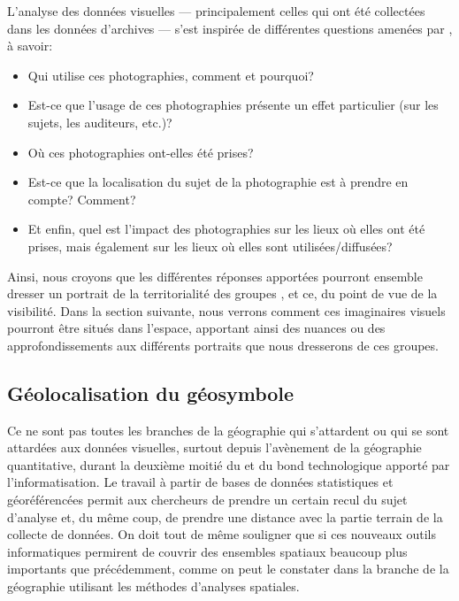 

L'analyse des données visuelles --- principalement celles qui ont été collectées dans les données d'archives --- s'est inspirée de différentes questions amenées par \citet[157]{Rose2008}, à savoir:
\begin{itemize}
 \item Qui utilise ces photographies, comment et pourquoi?
 \item Est-ce que l'usage de ces photographies présente un effet particulier (sur les sujets, les auditeurs, etc.)?
 \item Où ces photographies ont-elles été prises?
 \item Est-ce que la localisation du sujet de la photographie est à prendre en compte? Comment?
 \item Et enfin, quel est l'impact des photographies sur les lieux où elles ont été prises, mais également sur les lieux où elles sont utilisées/diffusées?
\end{itemize}

Ainsi, nous croyons que les différentes réponses apportées pourront ensemble dresser un portrait de la territorialité des groupes \lgbt{}, et ce, du point de vue de la visibilité.
Dans la section suivante, nous verrons comment ces imaginaires visuels pourront être situés dans l'espace, apportant ainsi des nuances ou des approfondissements aux différents portraits que nous dresserons de ces groupes.

\subsection{Géolocalisation du géosymbole}
\label{sub:g_olocalisation_du_sybole}

Ce ne sont pas toutes les branches de la géographie qui s'attardent ou qui se sont attardées aux données visuelles, surtout depuis l'avènement de la géographie quantitative, durant la deuxième moitié du  et du bond technologique apporté par l'informatisation.
Le travail à partir de bases de données statistiques et géoréférencées permit aux chercheurs de prendre un certain recul du sujet d'analyse et, du même coup, de prendre une distance avec la partie terrain de la collecte de données.
On doit tout de même souligner que si ces nouveaux outils informatiques permirent de couvrir des ensembles spatiaux beaucoup plus importants que précédemment, comme on peut le constater dans la branche de la géographie utilisant les méthodes d'analyses spatiales.

